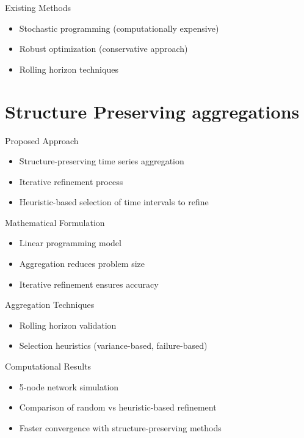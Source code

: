 \begin{frame}{Existing Methods}
    \begin{itemize}
        \item Stochastic programming (computationally expensive)
        \item Robust optimization (conservative approach)
        \item Rolling horizon techniques
    \end{itemize}
\end{frame}

\section{Structure Preserving aggregations}

\begin{frame}{Proposed Approach}
    \begin{itemize}
        \item Structure-preserving time series aggregation
        \item Iterative refinement process
        \item Heuristic-based selection of time intervals to refine
    \end{itemize}
\end{frame}

\begin{frame}{Mathematical Formulation}
    \begin{itemize}
        \item Linear programming model
        \item Aggregation reduces problem size
        \item Iterative refinement ensures accuracy
    \end{itemize}
\end{frame}

\begin{frame}{Aggregation Techniques}
    \begin{itemize}
        \item Rolling horizon validation
        \item Selection heuristics (variance-based, failure-based)
    \end{itemize}
\end{frame}


\begin{frame}{Computational Results}
    \begin{itemize}
        \item 5-node network simulation
        \item Comparison of random vs heuristic-based refinement
        \item Faster convergence with structure-preserving methods
    \end{itemize}
\end{frame}

